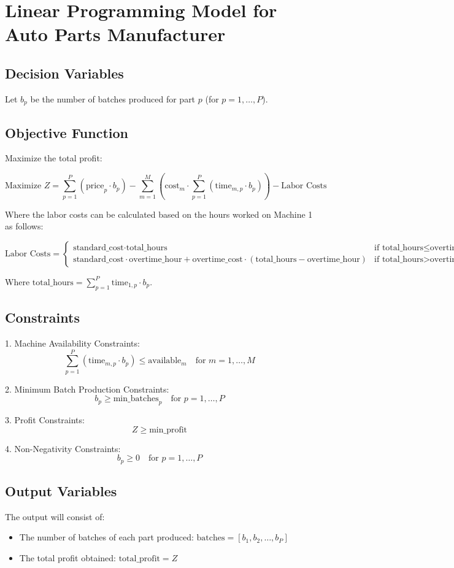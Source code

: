 \documentclass{article}
\begin{document}
\section*{Linear Programming Model for Auto Parts Manufacturer}

\subsection*{Decision Variables}
Let \( b_p \) be the number of batches produced for part \( p \) (for \( p = 1, \ldots, P \)).

\subsection*{Objective Function}
Maximize the total profit:

\[
\text{Maximize } Z = \sum_{p=1}^{P} \left( \text{price}_p \cdot b_p \right) - \sum_{m=1}^{M} \left( \text{cost}_m \cdot \sum_{p=1}^{P} \left( \text{time}_{m,p} \cdot b_p \right) \right) - \text{Labor Costs}
\]

Where the labor costs can be calculated based on the hours worked on Machine 1 as follows:

\[
\text{Labor Costs} = 
\begin{cases}
\text{standard\_cost} \cdot \text{total\_hours} & \text{if } \text{total\_hours} \leq \text{overtime\_hour} \\
\text{standard\_cost} \cdot \text{overtime\_hour} + \text{overtime\_cost} \cdot (\text{total\_hours} - \text{overtime\_hour}) & \text{if } \text{total\_hours} > \text{overtime\_hour}
\end{cases}
\]

Where \( \text{total\_hours} = \sum_{p=1}^{P} \text{time}_{1,p} \cdot b_p \).

\subsection*{Constraints}
1. Machine Availability Constraints:
   \[
   \sum_{p=1}^{P} \left( \text{time}_{m,p} \cdot b_p \right) \leq \text{available}_m \quad \text{for } m = 1, \ldots, M
   \]

2. Minimum Batch Production Constraints:
   \[
   b_p \geq \text{min\_batches}_p \quad \text{for } p = 1, \ldots, P
   \]

3. Profit Constraints:
   \[
   Z \geq \text{min\_profit}
   \]

4. Non-Negativity Constraints:
   \[
   b_p \geq 0 \quad \text{for } p = 1, \ldots, P
   \]

\subsection*{Output Variables}
The output will consist of:
\begin{itemize}
    \item The number of batches of each part produced: \( \text{batches} = [b_1, b_2, \ldots, b_P] \)
    \item The total profit obtained: \( \text{total\_profit} = Z \)
\end{itemize}
\end{document}
